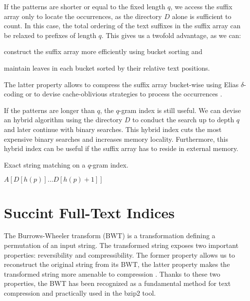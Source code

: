 If the patterns are shorter or equal to the fixed length $q$, we access the suffix array only to locate the occurrences, as the directory $D$ alone is sufficient to count.
In this case, the total ordering of the text suffixes in the suffix array can be relaxed to prefixes of length $q$.
This gives us a twofold advantage, as we can:
\begin{inparaenum}[(i)]
\item construct the suffix array more efficiently using bucket sorting and
\item maintain leaves in each bucket sorted by their relative text positions.
\end{inparaenum}
The latter property allows to compress the suffix array bucket-wise \eg using Elias $\delta$-coding \citep{?} or to devise cache-oblivious strategies to process the occurrences \citep{?}.

If the patterns are longer than $q$, the $q$-gram index is still useful.
We can devise an hybrid algorithm using the directory $D$ to conduct the search up to depth $q$ and later continue with binary searches.
This hybrid index cuts the most expensive binary searches and increases memory locality.
Furthermore, this hybrid index can be useful if the suffix array has to reside in external memory.

\begin{algorithm}[h]
\caption{Exact string matching on a $q$-gram index.}
\label{alg:qgram-exact}
\begin{algorithmic}[1]
	\State \Report $A[D[h(p)] \dots D[h(p)+1]]$
\EndProcedure
\end{algorithmic}
\end{algorithm}

\section{Succint Full-Text Indices}

The Burrows-Wheeler transform (BWT) \citep{Burrows1994} is a transformation defining a permutation of an input string.
The transformed string exposes two important properties: reversibility and compressibility.
The former property allows us to reconstruct the original string from its BWT, the latter property makes the transformed string more amenable to compression \citep{?}.
Thanks to these two properties, the BWT has been recognized as a fundamental method for text compression and practically used in the bzip2 \citep{?} tool.

